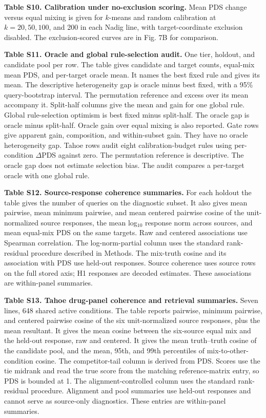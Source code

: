 \documentclass[12pt]{article}
\begin{document}
\begin{singlespace}
\noindent\textbf{Table S10. Calibration under no-exclusion scoring.} Mean PDS change versus equal mixing is given for $k$-means and random calibration at $k = 20, 50, 100$, and 200 in each Nadig line, with target-coordinate exclusion disabled. The exclusion-scored curves are in Fig. 7B for comparison.

\noindent\textbf{Table S11. Oracle and global rule-selection audit.} One tier, holdout, and candidate pool per row. The table gives candidate and target counts, equal-mix mean PDS, and per-target oracle mean. It names the best fixed rule and gives its mean. The descriptive heterogeneity gap is oracle minus best fixed, with a 95\% query-bootstrap interval. The permutation reference and excess over its mean accompany it. Split-half columns give the mean and gain for one global rule. Global rule-selection optimism is best fixed minus split-half. The oracle gap is oracle minus split-half. Oracle gain over equal mixing is also reported. Gate rows give apparent gain, composition, and within-subset gain. They have no oracle heterogeneity gap. Tahoe rows audit eight calibration-budget rules using per-condition $\Delta$PDS against zero. The permutation reference is descriptive. The oracle gap does not estimate selection bias. The audit compares a per-target oracle with one global rule.

\noindent\textbf{Table S12. Source-response coherence summaries.} For each holdout the table gives the number of queries on the diagnostic subset. It also gives mean pairwise, mean minimum pairwise, and mean centered pairwise cosine of the unit-normalized source responses, the mean log$_{10}$ response norm across sources, and mean equal-mix PDS on the same targets. Raw and centered associations use Spearman correlation. The log-norm-partial column uses the standard rank-residual procedure described in Methods. The mix-truth cosine and its association with PDS use held-out responses. Source coherence uses source rows on the full stored axis; H1 responses are decoded estimates. These associations are within-panel summaries.

\noindent\textbf{Table S13. Tahoe drug-panel coherence and retrieval summaries.} Seven lines, 648 shared active conditions. The table reports pairwise, minimum pairwise, and centered pairwise cosine of the six unit-normalized source responses, plus the mean resultant. It gives the mean cosine between the six-source equal mix and the held-out response, raw and centered. It gives the mean truth--truth cosine of the candidate pool, and the mean, 95th, and 99th percentiles of mix-to-other-condition cosine. The competitor-tail column is derived from PDS. Scores use the tie midrank and read the true score from the matching reference-matrix entry, so PDS is bounded at 1. The alignment-controlled column uses the standard rank-residual procedure. Alignment and pool summaries use held-out responses and cannot serve as source-only diagnostics. These entries are within-panel summaries.


\end{singlespace}
\end{document}
